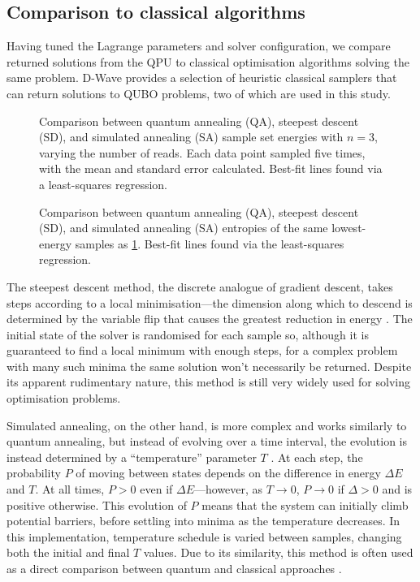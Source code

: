 \documentclass[12pt]{article}
\theoremstyle{definition}
\begin{document}
\subsection{Comparison to classical algorithms}

Having tuned the Lagrange parameters and solver configuration, we compare returned solutions from the QPU to classical optimisation algorithms solving the same problem. D-Wave provides a selection of heuristic classical samplers that can return solutions to QUBO problems, two of which are used in this study.

\begin{figure}[p]
    \centering\footnotesize
    
    \caption{Comparison between quantum annealing (QA), steepest descent (SD), and simulated annealing (SA) sample set energies with $n=3$, varying the number of reads. Each data point sampled five times, with the mean and standard error calculated. Best-fit lines found via a least-squares regression.}
    \label{fig:reads}
\end{figure}

\begin{figure}[p]
    \centering\footnotesize
    
    \caption{Comparison between quantum annealing (QA), steepest descent (SD), and simulated annealing (SA) entropies of the same lowest-energy samples as \cref{fig:reads}. Best-fit lines found via the least-squares regression.}
    \label{fig:entropy}
\end{figure}

The steepest descent method, the discrete analogue of gradient descent, takes steps according to a local minimisation---the dimension along which to descend is determined by the variable flip that causes the greatest reduction in energy \cite{dwave_samplers}. The initial state of the solver is randomised for each sample so, although it is guaranteed to find a local minimum with enough steps, for a complex problem with many such minima the same solution won't necessarily be returned. Despite its apparent rudimentary nature, this method is still very widely used for solving optimisation problems.

Simulated annealing, on the other hand, is more complex and works similarly to quantum annealing, but instead of evolving over a time interval, the evolution is instead determined by a ``temperature'' parameter $T$ \cite{kirkpatrick_optimization_1983}. At each step, the probability $P$ of moving between states depends on the difference in energy $\Delta E$ and $T$. At all times, $P>0$ even if $\Delta E$---however, as $T\to 0$, $P\to0$ if $\Delta>0$ and is positive otherwise. This evolution of $P$ means that the system can initially climb potential barriers, before settling into minima as the temperature decreases. In this implementation, temperature schedule is varied between samples, changing both the initial and final $T$ values. Due to its similarity, this method is often used as a direct comparison between quantum and classical approaches \cite{albash_demonstration_2018}.
\end{document}
